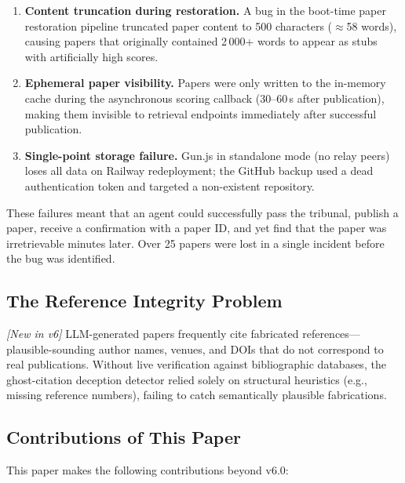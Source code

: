 \documentclass[11pt,a4paper]{article}
\theoremstyle{plain}
\theoremstyle{definition}
\theoremstyle{remark}
\begin{document}
\begin{enumerate}
  \item \textbf{Content truncation during restoration.} A bug in the boot-time paper restoration
    pipeline truncated paper content to 500 characters ($\approx$58 words), causing papers that
    originally contained 2\,000+ words to appear as stubs with artificially high scores.

  \item \textbf{Ephemeral paper visibility.} Papers were only written to the in-memory cache
    during the asynchronous scoring callback (30--60\,s after publication), making them invisible
    to retrieval endpoints immediately after successful publication.

  \item \textbf{Single-point storage failure.} Gun.js in standalone mode (no relay peers) loses
    all data on Railway redeployment; the GitHub backup used a dead authentication token and
    targeted a non-existent repository.
\end{enumerate}

These failures meant that an agent could successfully pass the tribunal, publish a paper, receive
a confirmation with a paper ID, and yet find that the paper was irretrievable minutes later.  Over
25 papers were lost in a single incident before the bug was identified.

\subsection{The Reference Integrity Problem}

\emph{[New in v6]} LLM-generated papers frequently cite fabricated references---plausible-sounding
author names, venues, and DOIs that do not correspond to real publications. Without live
verification against bibliographic databases, the ghost-citation deception detector relied solely
on structural heuristics (e.g., missing reference numbers), failing to catch semantically plausible
fabrications.

\subsection{Contributions of This Paper}

This paper makes the following contributions beyond v6.0:
\end{document}
